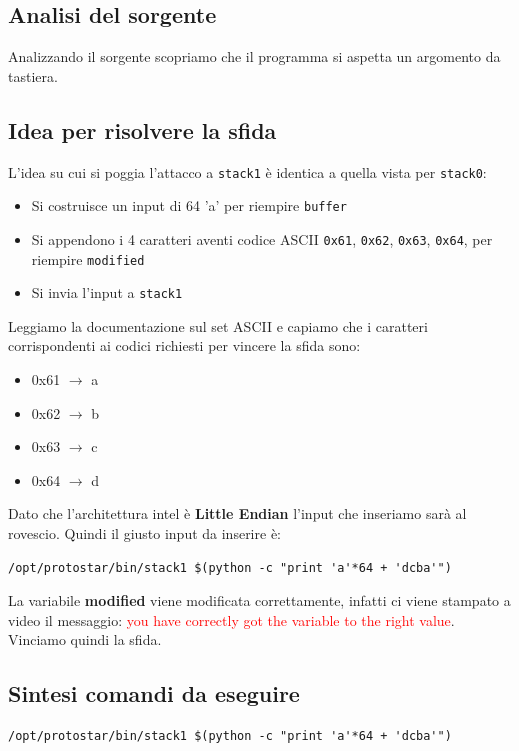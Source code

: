 \subsection{Analisi del sorgente}
Analizzando il sorgente scopriamo che il programma si aspetta un argomento da tastiera.

\subsection{Idea per risolvere la sfida}
L'idea su cui si poggia l'attacco a \texttt{stack1} è identica a quella vista per \texttt{stack0}:
\begin{itemize}
    \item Si costruisce un input di 64 'a' per riempire \texttt{buffer}
    \item Si appendono i 4 caratteri aventi codice ASCII \texttt{0x61}, \texttt{0x62}, \texttt{0x63}, \texttt{0x64}, per riempire \texttt{modified}
    \item Si invia l'input a \texttt{stack1}
\end{itemize}

Leggiamo la documentazione sul set ASCII e capiamo che i caratteri corrispondenti ai codici richiesti per vincere la sfida sono:
\begin{itemize}
    \item 0x61 $\rightarrow$ a
    \item 0x62 $\rightarrow$ b
    \item 0x63 $\rightarrow$ c
    \item 0x64 $\rightarrow$ d
\end{itemize}

Dato che l'architettura intel è \textbf{Little Endian} l'input che inseriamo sarà al rovescio. Quindi il giusto input da inserire è:
\begin{lstlisting}[style=bashstyle]
    /opt/protostar/bin/stack1 $(python -c "print 'a'*64 + 'dcba'")
\end{lstlisting}
La variabile \textbf{modified} viene modificata correttamente, infatti ci viene stampato a video il messaggio: \textcolor{red}{you have correctly got the variable to the right value}. Vinciamo quindi la sfida.

\subsection{Sintesi comandi da eseguire}
\begin{lstlisting}[style=bashstyle]
    /opt/protostar/bin/stack1 $(python -c "print 'a'*64 + 'dcba'")
\end{lstlisting}


